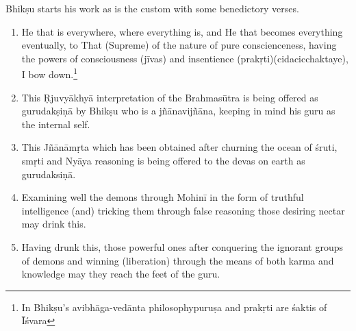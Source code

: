Bhikṣu starts his work as is the custom with some benedictory verses.
\begin{enumerate}
\item He that is everywhere, where everything is, and He that becomes everything eventually, to That (Supreme) of the nature of pure conscienceness, having the powers of consciousness  (jīvas) and insentience (prakṛti)(cidacicchaktaye), I bow down.\footnote{In Bhikṣu's avibhāga-vedānta philosophypuruṣa and prakṛti are śaktis of Īśvara}

\item This Ṛjuvyākhyā interpretation of the Brahmasūtra is being offered as gurudakṣiṇā  by Bhikṣu who is a jñānavijñāna, keeping in mind his guru as the internal self.
          
\item This Jñānāmṛta which has been obtained after churning the ocean of śruti, smṛti and Nyāya reasoning is being offered to the devas on earth as gurudaksiṇā.

\item Examining well the demons through Mohinī in the form of truthful intelligence (and) tricking them through false reasoning those desiring nectar may drink this.

\item Having drunk this, those powerful ones after conquering the ignorant groups of demons and winning (liberation) through the means of both karma and knowledge may they reach the feet of the guru.
\end{enumerate}


